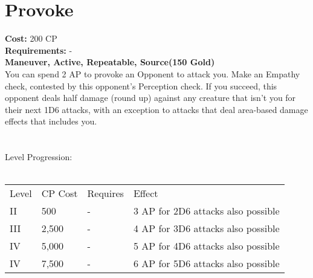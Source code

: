 \section{Provoke}\label{maneuver:provoke}
\textbf{Cost:} 200 CP\\
\textbf{Requirements:} -\\
\textbf{Maneuver, Active, Repeatable, Source(150 Gold)}\\
You can spend 2 AP to provoke an Opponent to attack you.
Make an Empathy check, contested by this opponent's Perception check.
If you succeed, this opponent deals half damage (round up) against any creature that isn't you for their next 1D6 attacks, with an exception to attacks that deal area-based damage effects that includes you.\\
\\
\\
Level Progression:\\
\\
\begin{tabular}{l | l | l | l}
	Level & CP Cost & Requires & Effect\\
	II & 500 & - & 3 AP for 2D6 attacks also possible\\
	III & 2,500 & - & 4 AP for 3D6 attacks also possible\\
	IV & 5,000 & - & 5 AP for 4D6 attacks also possible\\
	IV & 7,500 & - & 6 AP for 5D6 attacks also possible\\
\end{tabular}